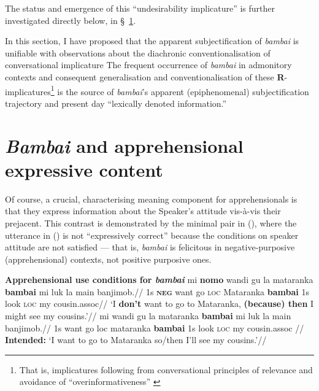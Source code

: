 \noindent The status and emergence of this ``undesirability implicature'' is further investigated directly below, in \S~\ref{bambai.expr}.


In this section, I have proposed that the apparent subjectification of \textit{bambai} is unifiable with observations about the diachronic conventionalisation of conversational implicature \citetext{\citealp[\textit{e.g.},][273\textit{ff}]{Cole1975} and especially Traugott's invited inferencing theory of semantic change (\citeyear{Traugott1980} \textit{et seq.})} The frequent occurrence of \textit{bambai} in admonitory contexts and consequent generalisation and conventionalisation of these \textbf{R}-implicatures\footnote{That is, implicatures following from conversational principles of relevance and avoidance of ``overinformativeness'' \citetext{\citealp{Horn1984} \textit{et seq.}}} is the source of \textit{bambai}'s apparent (epiphenomenal) subjectification trajectory and present day ``lexically denoted information.''

\section[Use conditions]{\textit{Bambai} and apprehensional expressive content} \label{bambai.expr}


Of course, a crucial, characterising meaning component for apprehensionals is that they express information about the Speaker's attitude vis-à-vis their prejacent. This contrast is demonstrated by the minimal pair in (), where the utterance in () is not ``expressively correct'' \citep[\textit{cf.}][]{Kaplan1999} because the conditions on speaker attitude are not satisfied --- that is, \textit{bambai} is felicitous in negative-purposive (apprehensional) contexts, not positive purposive ones.



\pex \textbf{Apprehensional use conditions for \textit{bambai}}
\a\begingl%
\gla mi \textbf{nomo} wandi gu la mataranka \textbf{bambai} mi luk la main banjimob.//
\glb 1s \textbf{\textsc{neg}} want go \textsc{loc} Mataranka \textbf{bambai} 1s look \textsc{loc} my cousin.\gls{assoc}//
\glft`I \textbf{don't} want to go to Mataranka, \textbf{(because) then }I might see my cousins.'//\endgl
\a\begingl\gla{}mi wandi gu la mataranka \textbf{bambai} mi luk la main banjimob.//
\glb 1s want go {\sc loc} mataranka \textbf{bambai} 1s look \textsc{loc} my cousin.\gls{assoc}	//
\glft\textbf{Intended:} `I want to go to Mataranka so/then I'll see my cousins.'\trailingcitation{[AJ~072017]}//\endgl\xe





